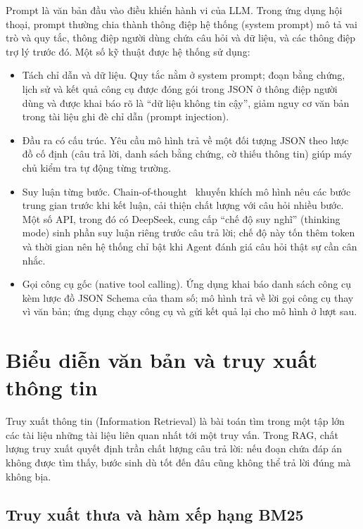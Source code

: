 Prompt là văn bản đầu vào điều khiển hành vi của LLM. Trong ứng dụng hội thoại, prompt thường chia thành thông điệp hệ thống (system prompt) mô tả vai trò và quy tắc, thông điệp người dùng chứa câu hỏi và dữ liệu, và các thông điệp trợ lý trước đó. Một số kỹ thuật được hệ thống sử dụng:
\begin{itemize}
    \item Tách chỉ dẫn và dữ liệu. Quy tắc nằm ở system prompt; đoạn bằng chứng, lịch sử và kết quả công cụ được đóng gói trong JSON ở thông điệp người dùng và được khai báo rõ là ``dữ liệu không tin cậy'', giảm nguy cơ văn bản trong tài liệu ghi đè chỉ dẫn (prompt injection).
    \item Đầu ra có cấu trúc. Yêu cầu mô hình trả về một đối tượng JSON theo lược đồ cố định (câu trả lời, danh sách bằng chứng, cờ thiếu thông tin) giúp máy chủ kiểm tra tự động từng trường.
    \item Suy luận từng bước. Chain-of-thought~\cite{wei2022cot} khuyến khích mô hình nêu các bước trung gian trước khi kết luận, cải thiện chất lượng với câu hỏi nhiều bước. Một số API, trong đó có DeepSeek, cung cấp ``chế độ suy nghĩ'' (thinking mode) sinh phần suy luận riêng trước câu trả lời; chế độ này tốn thêm token và thời gian nên hệ thống chỉ bật khi Agent đánh giá câu hỏi thật sự cần cân nhắc.
    \item Gọi công cụ gốc (native tool calling). Ứng dụng khai báo danh sách công cụ kèm lược đồ JSON Schema của tham số; mô hình trả về lời gọi công cụ thay vì văn bản; ứng dụng chạy công cụ và gửi kết quả lại cho mô hình ở lượt sau.
\end{itemize}

\section{Biểu diễn văn bản và truy xuất thông tin}
\label{sec:ir}

Truy xuất thông tin (Information Retrieval) là bài toán tìm trong một tập lớn các tài liệu những tài liệu liên quan nhất tới một truy vấn. Trong RAG, chất lượng truy xuất quyết định trần chất lượng câu trả lời: nếu đoạn chứa đáp án không được tìm thấy, bước sinh dù tốt đến đâu cũng không thể trả lời đúng mà không bịa.

\subsection{Truy xuất thưa và hàm xếp hạng BM25}
\label{sec:bm25}

